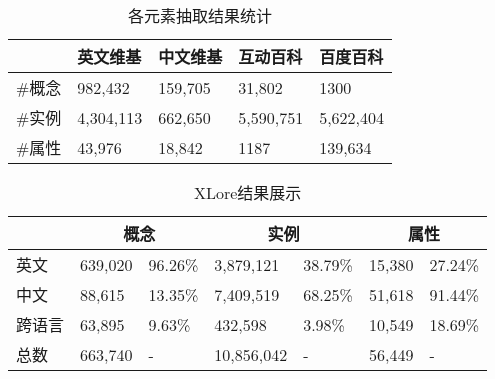 \begin{table}[htb]
    \centering
  \begin{minipage}[t]{0.8\linewidth}
    \caption{各元素抽取结果统计}
    \label{tab:extract-result}
    \begin{tabularx}{\linewidth}{lXXXX}
        \toprule[1.5pt]
               & 英文维基    & 中文维基   & 互动百科    & 百度百科     \\ \midrule[1pt]
        \#概念 & 982,432   & 159,705  & 31,802    & 1300      \\
        \#实例 & 4,304,113 & 662,650  & 5,590,751 & 5,622,404 \\
        \#属性 & 43,976    & 18,842   & 1187      & 139,634   \\
        \bottomrule[1.5pt]
    \end{tabularx}
  \end{minipage}
\end{table}

\begin{table}[htb]
    \centering
  \begin{minipage}[t]{0.9\linewidth}
    \caption{XLore结果展示}
    \label{tab:xlore-result}
    \begin{tabularx}{\linewidth}{lXXXXXX}
        \toprule[1.5pt]
        \multicolumn{1}{c}{} & \multicolumn{2}{c}{概念}     & \multicolumn{2}{c}{实例}                   & \multicolumn{2}{c}{属性}    \\ \midrule[1pt]
英文            & 639,020 & 96.26\%          & 3,879,121   & 38.79\%                & 15,380  & 27.24\%                \\
中文            & 88,615  & 13.35\%          & 7,409,519   & 68.25\%                & 51,618  & 91.44\%                \\
跨语言          & 63,895  & 9.63\%           & 432,598     & 3.98\%                 & 10,549  & 18.69\%                \\
总数           & 663,740 & {-}               & 10,856,042  & {-}                    & 56,449  & {-} \\
      \bottomrule[1.5pt]
    \end{tabularx}
  \end{minipage}
\end{table}

